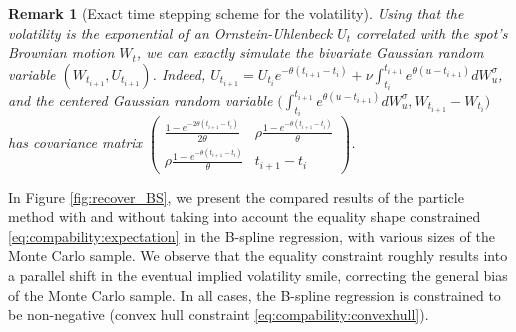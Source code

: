 \documentclass[a4paper]{article}
\newtheorem*{remark}{Remark}
\newcommand{\1}{\textbf{1}}
\begin{document}
\begin{remark}[Exact time stepping scheme for the volatility]
Using that the volatility is the exponential of an Ornstein-Uhlenbeck $U_t$ correlated with the spot's Brownian motion $W_t$, we can exactly simulate the bivariate Gaussian random variable $\left(W_{t_{i+1}}, U_{t_{i+1}}\right)$. Indeed, $U_{t_{i+1}} = U_{t_i} e^{-\theta (t_{i+1} - t_i)} + \nu \int_{t_i}^{t_{i+1}} e^{\theta (u - t_{i+1})} dW^{\sigma}_u$, and the centered Gaussian random variable $\Big(\int_{t_i}^{t_{i+1}} e^{\theta (u - t_{i+1})} dW^{\sigma}_u, W_{t_{i+1}} - W_{t_i} \Big)$ has covariance matrix $\left(\begin{array}{cc} \frac{1 - e^{-2\theta \left(t_{i+1}-t_i \right)}}{2\theta} & \rho \frac{1 - e^{-\theta \left(t_{i+1}-t_i \right)}}{\theta}\\ \rho \frac{1 - e^{-\theta \left(t_{i+1}-t_i \right)}}{\theta} & t_{i+1} - t_i \end{array}\right)$. 
\end{remark}
\vspace{2mm}
\par In Figure \ref{fig:recover_BS}, we present the compared results of the particle method with and without taking into account the equality shape constrained \eqref{eq:compability:expectation} in the B-spline regression, with various sizes of the Monte Carlo sample. We observe that the equality constraint roughly results into a parallel shift in the eventual implied volatility smile, correcting the general bias of the Monte Carlo sample. In all cases, the B-spline regression is constrained to be non-negative (convex hull constraint \eqref{eq:compability:convexhull}). 
\end{document}
